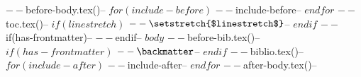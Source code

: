 \documentclass[$if(acm-metadata.acmart-options)$$acm-metadata.acmart-options$$else$manuscript,screen$if(acm-metadata.final)$$else$,review$endif$$if(acm-metadata.anonymous)$,anonymous$endif$$endif$]{acmart}
\begin{document}
$-- $before-body.tex()$
$-- $for(include-before)$
$-- $include-before$
$-- $endfor$
$-- $toc.tex()$
$-- $if(linestretch)$
$-- \setstretch{$linestretch$}
$-- $endif$
$-- $if(has-frontmatter)$
$-- \mainmatter
$-- $endif$
$-- $body$
$-- $before-bib.tex()$
$-- $if(has-frontmatter)$
$-- \backmatter
$-- $endif$
$-- $biblio.tex()$
$-- $for(include-after)$
$-- $include-after$
$-- $endfor$
$-- $after-body.tex()$
$-- 
\end{document}
